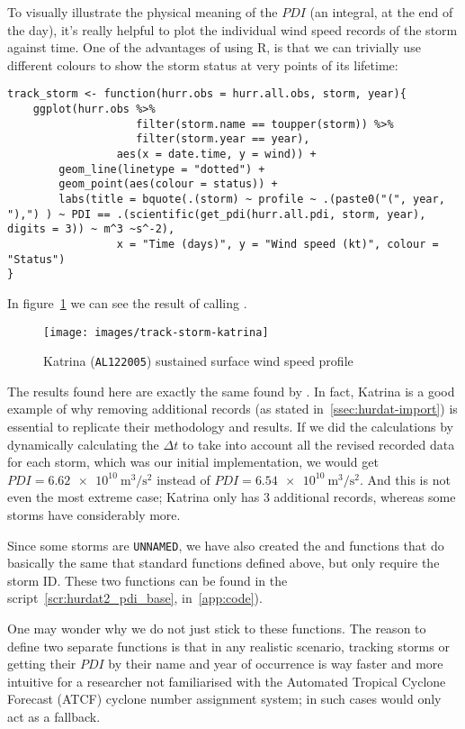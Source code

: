 To visually illustrate the physical meaning of the $PDI$ (an integral, at the end of the day), it's really helpful to plot the individual wind speed records of the storm against time. One of the advantages of using R, is that we can trivially use different colours to show the storm status at very points of its lifetime:
\begin{lstlisting}[caption=Function to track a single storm, label=snp:track-storm]
track_storm <- function(hurr.obs = hurr.all.obs, storm, year){
	ggplot(hurr.obs %>%
				 	filter(storm.name == toupper(storm)) %>%
				 	filter(storm.year == year),
				 aes(x = date.time, y = wind)) +
		geom_line(linetype = "dotted") +
		geom_point(aes(colour = status)) +
		labs(title = bquote(.(storm) ~ profile ~ .(paste0("(", year, "),") ) ~ PDI == .(scientific(get_pdi(hurr.all.pdi, storm, year), digits = 3)) ~ m^3 ~s^-2),
				 x = "Time (days)", y = "Wind speed (kt)", colour = "Status")
}
\end{lstlisting}

In figure~\ref{fig:katrina} we can see the result of calling .
\begin{figure}[H]
	\centering
	\texttt{[image: images/track-storm-katrina]}
	\caption{Katrina (\texttt{AL122005}) sustained surface wind speed profile}
	\label{fig:katrina}
\end{figure}

The results found here are exactly the same found by \citeauthor{Corral2010}. In fact, Katrina is a good example of why removing additional records (as stated in~\cref{ssec:hurdat-import}) is essential to replicate their methodology and results. If we did the calculations by dynamically calculating the $\Delta t$ to take into account all the revised recorded data for each storm, which was our initial implementation, we would get $PDI = \SI{6.62 e10}{\cubic\m\per\square\s}$ instead of $PDI = \SI{6.54 e10}{\cubic\m\per\square\s}$. And this is not even the most extreme case; Katrina only has 3 additional records, whereas some storms have considerably more.

\sk
Since some storms are \texttt{UNNAMED}, we have also created the  and  functions that do basically the same that standard functions defined above, but only require the storm ID. These two functions can be found in the script~\ref{scr:hurdat2_pdi_base}, in~\cref{app:code}).

One may wonder why we do not just stick to these  functions. The reason to define two separate functions is that in any realistic scenario, tracking storms or getting their $PDI$ by their name and year of occurrence is way faster and more intuitive for a researcher not familiarised with the Automated Tropical Cyclone Forecast (ATCF) cyclone number assignment system; in such cases  would only act as a fallback.

